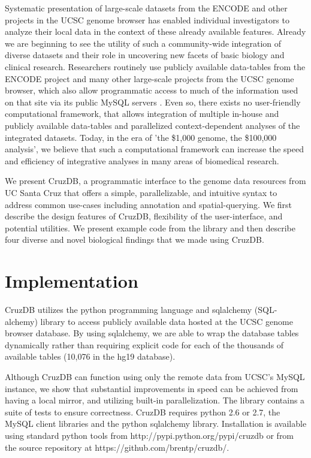 \documentclass[10pt]{bmc_article}
\newenvironment{bmcformat}{\baselineskip20pt\sloppy\setboolean{publ}{false}}{\baselineskip20pt\sloppy}
\begin{document}
\begin{bmcformat}
Systematic presentation of large-scale datasets from the ENCODE and other projects in the UCSC genome browser has enabled individual investigators to analyze their local data in the context of these already available features. Already we are beginning to see the utility of such a community-wide integration of diverse datasets and their role in uncovering new facets of basic biology and clinical research. Researchers routinely use publicly available data-tables from the ENCODE project and many other large-scale projects from the UCSC genome browser, which also allow programmatic access to much of the information used on that site via its public MySQL servers \cite{Dreszer}. Even so, there exists no user-friendly computational framework, that allows integration of multiple in-house and publicly available data-tables and parallelized context-dependent analyses of the integrated datasets. Today, in the era of 'the \$1,000 genome, the \$100,000 analysis', we believe that such a computational framework can increase the speed and efficiency of integrative analyses in many areas of biomedical research. 

We present CruzDB, a programmatic interface to the genome data resources from UC Santa Cruz that offers a simple, parallelizable, and intuitive syntax to address common use-cases including annotation and spatial-querying. We first describe the design features of CruzDB, flexibility of the user-interface, and potential utilities. We present example code from the library and then describe four diverse and novel biological findings that we made using CruzDB.


\section*{Implementation}
CruzDB utilizes the python programming language and sqlalchemy (SQL-alchemy) library to access publicly available data hosted at the UCSC genome browser database. By using sqlalchemy, we are able to wrap the database tables dynamically rather than requiring explicit code for each of the thousands of available tables (10,076 in the hg19 database). 

Although CruzDB can function using only the remote data from UCSC's MySQL instance, we show that  substantial improvements in speed can be achieved from having a local mirror, and utilizing built-in parallelization. The library contains a suite of tests to ensure correctness. CruzDB requires python 2.6 or 2.7, the MySQL client libraries and the python sqlalchemy library. Installation is available using standard python tools from http://pypi.python.org/pypi/cruzdb or from the source repository at https://github.com/brentp/cruzdb/.


\end{bmcformat}
\end{document}
